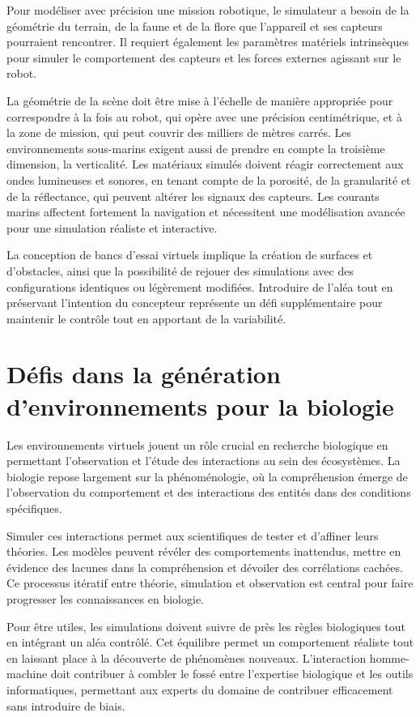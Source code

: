 Pour modéliser avec précision une mission robotique, le simulateur a besoin de la géométrie du terrain, de la faune et de la flore que l'appareil et ses capteurs pourraient rencontrer. Il requiert également les paramètres matériels intrinsèques pour simuler le comportement des capteurs et les forces externes agissant sur le robot.

La géométrie de la scène doit être mise à l'échelle de manière appropriée pour correspondre à la fois au robot, qui opère avec une précision centimétrique, et à la zone de mission, qui peut couvrir des milliers de mètres carrés. Les environnements sous-marins exigent aussi de prendre en compte la troisième dimension, la verticalité. Les matériaux simulés doivent réagir correctement aux ondes lumineuses et sonores, en tenant compte de la porosité, de la granularité et de la réflectance, qui peuvent altérer les signaux des capteurs. Les courants marins affectent fortement la navigation et nécessitent une modélisation avancée pour une simulation réaliste et interactive.

La conception de bancs d'essai virtuels implique la création de surfaces et d'obstacles, ainsi que la possibilité de rejouer des simulations avec des configurations identiques ou légèrement modifiées. Introduire de l'aléa tout en préservant l'intention du concepteur représente un défi supplémentaire pour maintenir le contrôle tout en apportant de la variabilité.

\section*{Défis dans la génération d'environnements pour la biologie}

Les environnements virtuels jouent un rôle crucial en recherche biologique en permettant l'observation et l'étude des interactions au sein des écosystèmes. La biologie repose largement sur la phénoménologie, où la compréhension émerge de l'observation du comportement et des interactions des entités dans des conditions spécifiques.

Simuler ces interactions permet aux scientifiques de tester et d'affiner leurs théories. Les modèles peuvent révéler des comportements inattendus, mettre en évidence des lacunes dans la compréhension et dévoiler des corrélations cachées. Ce processus itératif entre théorie, simulation et observation est central pour faire progresser les connaissances en biologie.

Pour être utiles, les simulations doivent suivre de près les règles biologiques tout en intégrant un aléa contrôlé. Cet équilibre permet un comportement réaliste tout en laissant place à la découverte de phénomènes nouveaux. L'interaction homme-machine doit contribuer à combler le fossé entre l'expertise biologique et les outils informatiques, permettant aux experts du domaine de contribuer efficacement sans introduire de biais.

